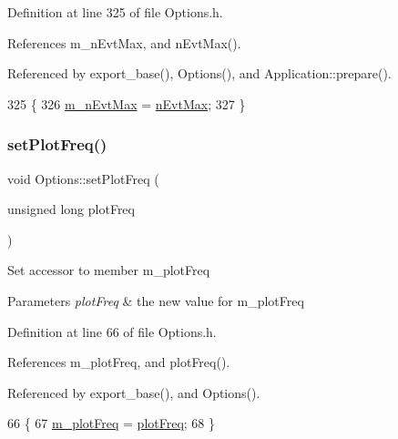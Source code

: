Definition at line 325 of file Options.\+h.



References m\+\_\+n\+Evt\+Max, and n\+Evt\+Max().



Referenced by export\+\_\+base(), Options(), and Application\+::prepare().


\begin{DoxyCode}
325                                       \{
326                 \hyperlink{classOptions_a825a47258257937a8caa902f5fff7e8a}{m\_nEvtMax} = \hyperlink{classOptions_ad1f3b03d734c806a2feca418b26bcc9b}{nEvtMax};
327         \}
\end{DoxyCode}
\mbox{\label{classOptions_a7df298047f1506fa2244cf096da96409}} 
\subsubsection{\texorpdfstring{set\+Plot\+Freq()}{setPlotFreq()}}
{\footnotesize\ttfamily void Options\+::set\+Plot\+Freq (\begin{DoxyParamCaption}\item[{unsigned long}]{plot\+Freq }\end{DoxyParamCaption})\hspace{0.3cm}{\ttfamily [inline]}}

Set accessor to member m\+\_\+plot\+Freq 
\begin{DoxyParams}{Parameters}
{\em plot\+Freq} & the new value for m\+\_\+plot\+Freq \\
\hline
\end{DoxyParams}


Definition at line 66 of file Options.\+h.



References m\+\_\+plot\+Freq, and plot\+Freq().



Referenced by export\+\_\+base(), and Options().


\begin{DoxyCode}
66                                                   \{
67                 \hyperlink{classOptions_aa7f7161bc67732b310937afb137657a0}{m\_plotFreq} = \hyperlink{classOptions_a1e20abb20c1a2187f9455b39cd9d26ae}{plotFreq};
68         \}
\end{DoxyCode}
\mbox{\label{classOptions_adac15a8dbae0183ae7cecc09ebba6887}} 

